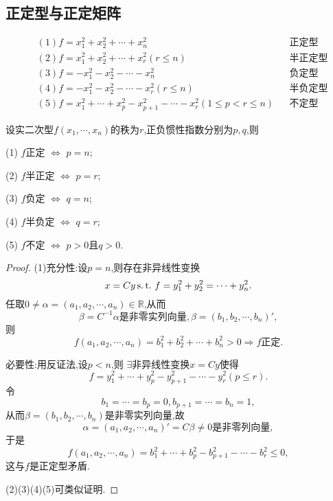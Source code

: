 \subsection{正定型与正定矩阵}

\begin{example}
  \begin{align*}
    & (1) f=x_1^2+x_2^2+\cdots+x_n^2 && \text{正定型}\\
    & (2) f=x_1^2+x_2^2+\cdots+x_r^2(r \leq n) && \text{半正定型}\\
    & (3) f=-x_1^2-x_2^2-\cdots-x_n^2 && \text{负定型}\\
    & (4) f=-x_1^2-x_2^2-\cdots-x_r^2(r \leq n) && \text{半负定型}\\
    & (5) f=x_1^2+\cdots+x_p^2-x_{p+1}^2-\cdots-x_r^2(1\leq p < r \leq n) && \text{不定型}
  \end{align*}
\end{example}

\begin{theorem}\label{thm:PN1}
  设实二次型$f(x_1,\cdots,x_n)$的秩为$r$,正负惯性指数分别为$p, q$,则

  (1) $f$正定 $\Longleftrightarrow$ $p=n$;

  (2) $f$半正定 $\Longleftrightarrow$ $p=r$;

  (3) $f$负定 $\Longleftrightarrow$ $q=n$;

  (4) $f$半负定 $\Longleftrightarrow$ $q=r$;

  (5) $f$不定 $\Longleftrightarrow$ $p>0$且$q>0$.
\end{theorem}

\begin{proof}
  (1)充分性:设$p=n$,则存在非异线性变换
  \[ x=Cy \operatorname{{}s.t.{}} f=y_1^2+y_2^2=\cdots+y_n^2. \]
  任取$0 \neq \alpha = (a_1,a_2,\cdots,a_n) \in \mathbb{R}$,从而
  \[ \beta = C^{-1}\alpha\text{是非零实列向量}, \beta=(b_1,b_2,\cdots,b_n)', \]
  则
  \[ f(a_1,a_2,\cdots,a_n)=b_1^2+b_2^2+\cdots+b_n^2 >0 \Longrightarrow f \text{正定}. \]

  必要性:用反证法,设$p<n$,则
  $\exists$非异线性变换$x=Cy$使得
  \[ f=y_1^2+\cdots+y_p^2-y_{p+1}^2-\cdots-y_r^2(p \leq r). \]
  令
  \[b_1=\cdots=b_p=0, b_{p+1}=\cdots=b_n=1, \]
  从而$\beta=(b_1,b_2,\cdots,b_n)$是非零实列向量,故
  \[ \alpha = (a_1,a_2,\cdots,a_n)'=C\beta \neq 0 \text{是非零列向量} , \]
  于是
  \[ f(a_1,a_2,\cdots,a_n)=b_1^2+\cdots+b_p^2-b_{p+1}^2-\cdots-b_r^2 \leq 0, \]
  这与$f$是正定型矛盾.

  (2)(3)(4)(5)可类似证明.
\end{proof}


